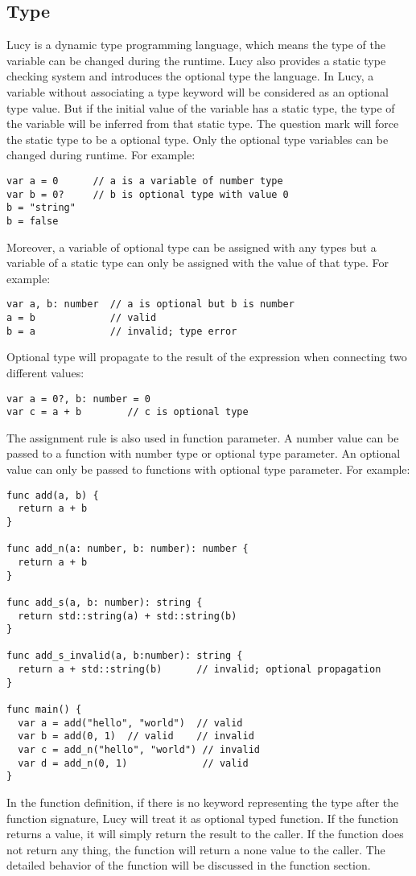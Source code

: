 \subsection{Type}
Lucy is a dynamic type programming language, which means the type of the variable can be changed during the runtime. Lucy also provides a static type checking system and introduces the optional type the language. In Lucy, a variable without associating a type keyword will be considered as an optional type value. But if the initial value of the variable has a static type, the type of the variable will be inferred from that static type. The question mark will force the static type to be a optional type. Only the optional type variables can be changed during runtime. For example:
\begin{lstlisting}
var a = 0      // a is a variable of number type
var b = 0?     // b is optional type with value 0
b = "string"
b = false
\end{lstlisting}
Moreover, a variable of optional type can be assigned with any types but a variable of a static type can only be assigned with the value of that type. For example:
\begin{lstlisting}
var a, b: number  // a is optional but b is number
a = b             // valid
b = a             // invalid; type error
\end{lstlisting}
Optional type will propagate to the result of the expression when connecting two different values:
\begin{lstlisting}
var a = 0?, b: number = 0
var c = a + b        // c is optional type
\end{lstlisting}
The assignment rule is also used in function parameter. A number value can be passed to a function with number type or optional type parameter. An optional value can only be passed to functions with optional type parameter. For example:
\begin{lstlisting}
func add(a, b) {
  return a + b
}

func add_n(a: number, b: number): number {
  return a + b
}

func add_s(a, b: number): string {
  return std::string(a) + std::string(b)
}

func add_s_invalid(a, b:number): string {
  return a + std::string(b)      // invalid; optional propagation
}

func main() {
  var a = add("hello", "world")  // valid
  var b = add(0, 1)  // valid    // invalid
  var c = add_n("hello", "world") // invalid
  var d = add_n(0, 1)             // valid
}
\end{lstlisting}
In the function definition, if there is no keyword representing the type after the function signature, Lucy will treat it as optional typed function. If the function returns a value, it will simply return the result to the caller. If the function does not return any thing, the function will return a none value to the caller. The detailed behavior of the function will be discussed in the function section.

